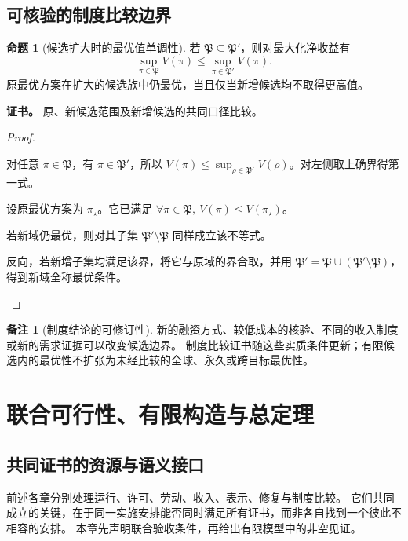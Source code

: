 \documentclass[UTF8,12pt,a4paper,openany,fontset=none,zihao=false]{ctexrep}
\theoremstyle{definition}
\newtheorem{proposition}{命题}[chapter]
\newtheorem{remark}{备注}[chapter]
\newenvironment{certificate}{\par\noindent\textbf{证书。}\ignorespaces}{\par}
\newcommand{\1}{\mathbf 1}
\begin{document}
\section{可核验的制度比较边界}

\begin{proposition}[候选扩大时的最优值单调性]
若 \(\mathfrak P\subseteq\mathfrak P'\)，则对最大化净收益有
\[
\sup_{\pi\in\mathfrak P}V(\pi)
\le\sup_{\pi\in\mathfrak P'}V(\pi).
\]
原最优方案在扩大的候选族中仍最优，当且仅当新增候选均不取得更高值。
\end{proposition}
\begin{certificate}
原、新候选范围及新增候选的共同口径比较。
\end{certificate}
\begin{proof}
\begin{semanticsteps}
\item 对任意 \(\pi\in\mathfrak P\)，有 \(\pi\in\mathfrak P'\)，所以
\(V(\pi)\le\sup_{\rho\in\mathfrak P'}V(\rho)\)。对左侧取上确界得第一式。
\item 设原最优方案为 \(\pi_\star\)。它已满足
\(\forall\pi\in\mathfrak P,\ V(\pi)\le V(\pi_\star)\)。
\item 若新域仍最优，则对其子集 \(\mathfrak P'\setminus\mathfrak P\) 同样成立该不等式。
\item 反向，若新增子集均满足该界，将它与原域的界合取，并用
\(\mathfrak P'=\mathfrak P\cup(\mathfrak P'\setminus\mathfrak P)\)，得到新域全称最优条件。
\end{semanticsteps}
\end{proof}

\begin{remark}[制度结论的可修订性]
新的融资方式、较低成本的核验、不同的收入制度或新的需求证据可以改变候选边界。
制度比较证书随这些实质条件更新；有限候选内的最优性不扩张为未经比较的全球、永久或跨目标最优性。
\end{remark}

\chapter{联合可行性、有限构造与总定理}
\label{joint:chapter}

\section{共同证书的资源与语义接口}

前述各章分别处理运行、许可、劳动、收入、表示、修复与制度比较。
它们共同成立的关键，在于同一实施安排能否同时满足所有证书，而非各自找到一个彼此不相容的安排。
本章先声明联合验收条件，再给出有限模型中的非空见证。
\end{document}
